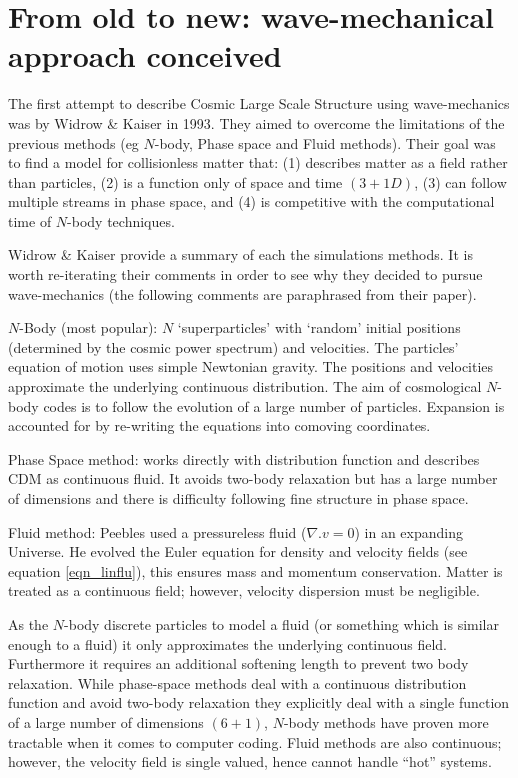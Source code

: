 \section{From old to new: wave-mechanical approach conceived}
\label{lsswm_con}
The first attempt to describe Cosmic Large Scale Structure using wave-mechanics was by Widrow \& Kaiser \citep{bib_wk} in 1993. They aimed
to overcome the limitations of the previous methods (eg $N$-body, Phase space and Fluid methods). Their goal was to find a model for collisionless
matter that: (1) describes matter as a field rather than particles, (2) is a function only of space and time $(3+1D)$, (3) can follow multiple streams in phase space, and (4) is competitive with the computational time of $N$-body techniques.

Widrow \& Kaiser \citep{bib_wk} provide a summary of each the simulations methods. It is worth re-iterating their comments in order to see why they decided to pursue wave-mechanics (the following comments are paraphrased from their paper).
\newline

$N$-Body (most popular): $N$ `superparticles' with `random' initial positions (determined by the cosmic power spectrum) and velocities. The particles' equation of motion uses simple Newtonian gravity. The positions and velocities approximate the underlying continuous distribution. The aim of cosmological $N$-body codes is to follow the evolution of a large number of particles. Expansion is accounted for by re-writing the equations into comoving coordinates.
\newline

Phase Space method: works directly with distribution function and describes CDM as continuous fluid. It avoids two-body relaxation but has a large number of dimensions and there is difficulty following fine structure in phase space.
\newline

Fluid method: Peebles \citep{bib_peeb2} used a pressureless fluid ($\nabla . v = 0$) in an expanding Universe. He evolved the Euler equation for density and velocity fields (see equation \ref{eqn_linflu}), this ensures mass and momentum conservation. Matter is treated as a continuous field; however, velocity dispersion must be negligible.
\newline

As the $N$-body discrete particles to model a fluid (or something which is similar enough to a fluid) it only approximates the underlying continuous field. Furthermore it requires an additional softening length to prevent two body relaxation. While phase-space methods deal with a continuous distribution function and avoid two-body relaxation they explicitly deal with a single function of a large number of dimensions $(6+1)$, $N$-body methods have proven more tractable when it comes to computer coding. Fluid methods are also continuous; however, the velocity field is single valued, hence cannot handle ``hot'' systems.

